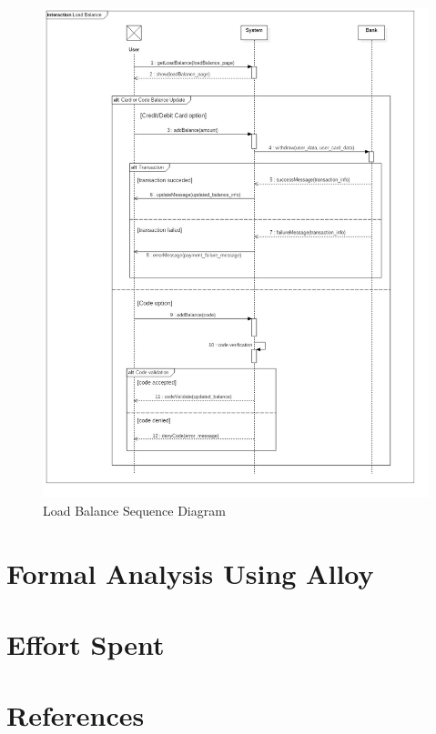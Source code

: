 \documentclass{article}
\begin{document}
\begin{figure}[H]
\includegraphics[width=\linewidth]{Load_Balance.jpg}
\caption{Load Balance Sequence Diagram}
\label{fig:SQ8}
\end{figure}


\section{Formal Analysis Using Alloy}
\section{Effort Spent}
\section{References}
\end{document}
